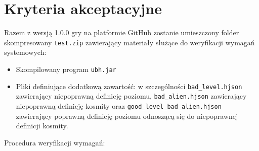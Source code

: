 \documentclass{article}
\begin{document}
	\section{Kryteria akceptacyjne}
	
		Razem z wersją 1.0.0 gry na platformie GitHub zostanie umieszczony folder skompresowany \verb|test.zip| zawierający materiały służące do weryfikacji wymagań systemowych:
		\begin{itemize}
			\item Skompilowany program \verb|ubh.jar|
			\item Pliki definiujące dodatkową zawartość: w szczególności \verb|bad_level.hjson| zawierający niepoprawną definicję poziomu, \verb|bad_alien.hjson| zawierający niepoprawną definicję kosmity oraz \verb|good_level_bad_alien.hjson| zawierający poprawną definicję poziomu odnoszącą się do niepoprawnej definicji kosmity.
		\end{itemize}
		Procedura weryfikacji wymagań:
\end{document}
